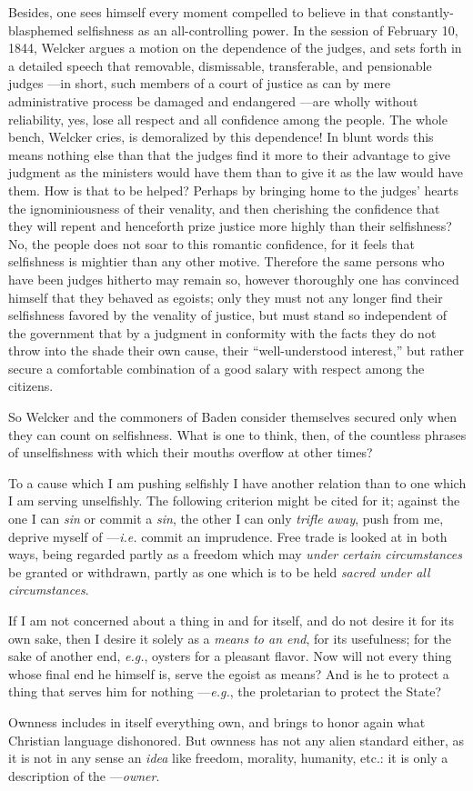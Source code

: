 Besides, one sees himself every moment compelled to believe in that 
constantly-blasphemed selfishness as an all-controlling power. In the session 
of February 10, 1844, Welcker argues a motion on the dependence of the judges, 
and sets forth in a detailed speech that removable, dismissable, transferable, 
and pensionable judges ---in short, such members of a court of justice as can 
by mere administrative process be damaged and endangered ---are wholly without 
reliability, yes, lose all respect and all confidence among the people. The 
whole bench, Welcker cries, is demoralized by this dependence! In blunt words 
this means nothing else than that the judges find it more to their advantage 
to give judgment as the ministers would have them than to give it as the law 
would have them. How is that to be helped? Perhaps by bringing home to the 
judges' hearts the ignominiousness of their venality, and then cherishing the 
confidence that they will repent and henceforth prize justice more highly than 
their selfishness? No, the people does not soar to this romantic confidence, 
for it feels that selfishness is mightier than any other motive. Therefore the 
same persons who have been judges hitherto may remain so, however thoroughly 
one has convinced himself that they behaved as egoists; only they must not any 
longer find their selfishness favored by the venality of justice, but must 
stand so independent of the government that by a judgment in conformity with 
the facts they do not throw into the shade their own cause, their 
``well-understood interest,'' but rather secure a comfortable combination of 
a good salary with respect among the citizens.

So Welcker and the commoners of Baden consider themselves secured only when 
they can count on selfishness. What is one to think, then, of the countless 
phrases of unselfishness with which their mouths overflow at other times?

To a cause which I am pushing selfishly I have another relation than to one 
which I am serving unselfishly. The following criterion might be cited for it; 
against the one I can \textit{sin} or commit a \textit{sin}, the other I can 
only \textit{trifle away}, push from me, deprive myself of ---\textit{i.e.} 
commit an imprudence. Free trade is looked at in both ways, being regarded 
partly as a freedom which may \textit{under certain circumstances} be granted 
or withdrawn, partly as one which is to be held \textit{sacred under all 
circumstances}.

If I am not concerned about a thing in and for itself, and do not desire it 
for its own sake, then I desire it solely as a \textit{means to an end}, for 
its usefulness; for the sake of another end, \textit{e.g.}, oysters for a 
pleasant flavor. Now will not every thing whose final end he himself is, serve 
the egoist as means? And is he to protect a thing that serves him for nothing ---\textit{e.g.}, the proletarian to protect the State?

Ownness includes in itself everything own, and brings to honor again what 
Christian language dishonored. But ownness has not any alien standard either, 
as it is not in any sense an \textit{idea} like freedom, morality, humanity, 
etc.: it is only a description of the ---\textit{owner}.
